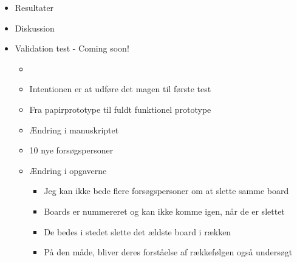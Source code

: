 \begin{itemize}
	\item Resultater
	\item Diskussion
	\item Validation test - Coming soon!
	\begin{itemize}
		\item 
		\item Intentionen er at udføre det magen til første test
		\item Fra papirprototype til fuldt funktionel prototype
		\item Ændring i manuskriptet
		\item 10 nye forsøgspersoner
		\item Ændring i opgaverne
		\begin{itemize}
			\item Jeg kan ikke bede flere forsøgspersoner om at slette samme board
			\item Boards er nummereret og kan ikke komme igen, når de er slettet
			\item De bedes i stedet slette det ældste board i rækken
			\item På den måde, bliver deres forståelse af rækkefølgen også undersøgt
		\end{itemize}
	\end{itemize}
\end{itemize}



















